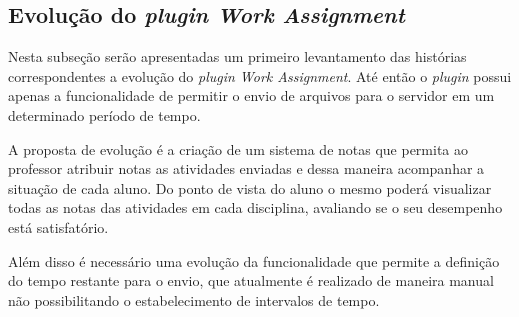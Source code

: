 \subsection{Evolução do \textit{plugin Work Assignment}}

Nesta subseção serão apresentadas um primeiro levantamento das histórias correspondentes a evolução do \textit{plugin Work Assignment}. Até então o \textit{plugin} possui apenas a funcionalidade de permitir o envio de arquivos para o servidor em um determinado período de tempo.

A proposta de evolução é a criação de um sistema de notas que permita ao professor atribuir notas as atividades enviadas e dessa maneira acompanhar a situação de cada aluno. Do ponto de vista do aluno o mesmo poderá visualizar todas as notas das atividades em cada disciplina, avaliando se o seu desempenho está satisfatório.

Além disso é necessário uma evolução da funcionalidade que permite a definição do tempo restante para o envio, que atualmente é realizado de maneira manual não possibilitando o estabelecimento de intervalos de tempo.

